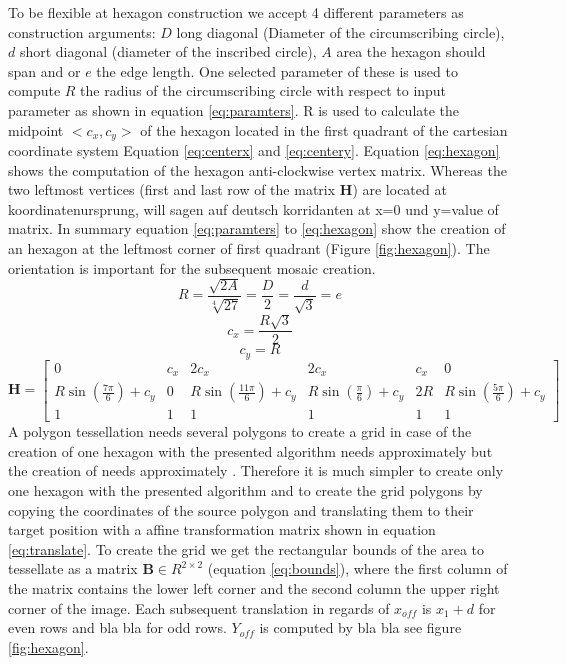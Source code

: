 		To be flexible at hexagon construction we accept 4 different parameters as construction arguments: $D$ long diagonal (Diameter of the circumscribing circle), $d$ short diagonal (diameter of the inscribed circle), $A$ area the hexagon should span and or $e$ the edge length. One selected parameter of these is used to compute $R$ the radius of the circumscribing circle with respect to input parameter as shown in  equation \ref{eq:paramters}. R is used to calculate the midpoint $<c_x, c_y>$ of the hexagon located in the first quadrant of the cartesian coordinate system Equation \ref{eq:centerx} and \ref{eq:centery}. Equation \ref{eq:hexagon} shows the computation of the hexagon anti-clockwise vertex matrix. Whereas the two leftmost vertices (first and last row of the matrix $\textbf{H}$) are located at koordinatenursprung, will sagen auf deutsch korridanten at x=0 und y=value of matrix. In summary equation \ref{eq:paramters} to \ref{eq:hexagon} show the creation of an hexagon at the leftmost corner of first quadrant (Figure \ref{fig:hexagon}). The orientation is important for the subsequent mosaic creation.
		\begin{equation}
		\label{eq:paramters}
			R = \frac{\sqrt{2A}}{\sqrt[4]{27}} = \frac{D}{2} = \frac{d}{\sqrt{3}} = e
		\end{equation}
		\begin{equation}
		\label{eq:centerx}
			c_x = \frac{R\sqrt{3}}{2} 
		\end{equation}
		\begin{equation}
		\label{eq:centery}
			c_y = R
		\end{equation}
		\begin{equation}
		\label{eq:hexagon}
			\mathbf{H} =
			\begin{bmatrix}
				0 & c_x & 2c_x & 2c_x & c_x & 0 \\
				R\sin\left(\frac{7\pi}{6}\right) + c_y & 0 & R\sin\left(\frac{11\pi}{6}\right)+c_y & R\sin\left(\frac{\pi}{6}\right)+c_y & 2R & R\sin\left(\frac{5\pi}{6}\right)+c_y \\
				1 & 1 & 1 & 1 & 1 & 1
			\end{bmatrix}
		\end{equation}
		A polygon tessellation needs several polygons to create a grid in case of the creation of one hexagon with the presented algorithm needs approximately  but the creation of  needs approximately . Therefore it is much simpler to create only one hexagon with the presented algorithm and to create the grid polygons by copying the coordinates of the source polygon and translating them to their target position with a affine transformation matrix shown in equation \ref{eq:translate}. To create the grid we get the rectangular bounds of the area to tessellate as a matrix $\textbf{B} \in R^{2\times2}$ (equation \ref{eq:bounds}), where the first column of the matrix contains the lower left corner and the second column the upper right corner of the image. Each subsequent translation in regards of $x_{off}$ is $x_1 + d$ for even rows and bla bla for odd rows. $Y_{off}$ is computed by bla bla see figure \ref{fig:hexagon}.
